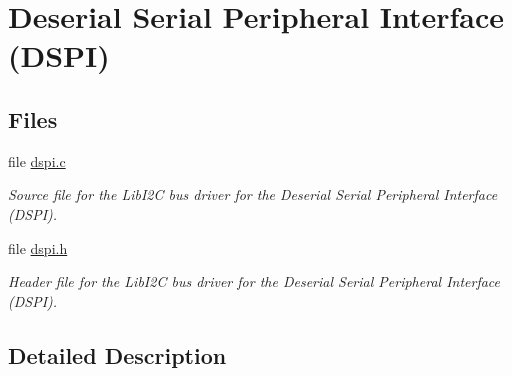 \hypertarget{group__mpc55xx__dspi}{}\section{Deserial Serial Peripheral Interface (D\+S\+PI)}
\label{group__mpc55xx__dspi}
\subsection*{Files}
\begin{DoxyCompactItemize}
\item 
file \mbox{\hyperlink{dspi_8c}{dspi.\+c}}
\begin{DoxyCompactList}\small\item\em Source file for the Lib\+I2C bus driver for the Deserial Serial Peripheral Interface (D\+S\+PI). \end{DoxyCompactList}\item 
file \mbox{\hyperlink{dspi_8h}{dspi.\+h}}
\begin{DoxyCompactList}\small\item\em Header file for the Lib\+I2C bus driver for the Deserial Serial Peripheral Interface (D\+S\+PI). \end{DoxyCompactList}\end{DoxyCompactItemize}


\subsection{Detailed Description}
